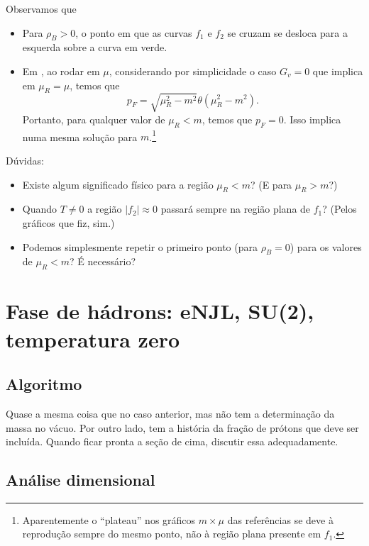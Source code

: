 Observamos que
\begin{itemize}
	\item Para $\rho_B > 0$, o ponto em que as curvas $f_1$ e $f_2$ se cruzam se desloca para a esquerda sobre a curva em verde.
	\item Em \textcite{Buballa1996}, ao rodar em $\mu$, considerando por simplicidade o caso $G_v = 0$ que implica em $\mu_R = \mu$, temos que
		\begin{equation}
			p_F = \sqrt{\mu_R^2 - m^2}\theta(\mu_R^2 - m^2).
		\end{equation}
		Portanto, para qualquer valor de $\mu_R < m$, temos que $p_F = 0$. Isso implica numa mesma solução para $m$.\footnote{Aparentemente o ``plateau'' nos gráficos $m \times \mu$ das referências se deve à reprodução sempre do mesmo ponto, não à região plana presente em $f_1$.}
\end{itemize}

Dúvidas:
\begin{itemize}
	\item Existe algum significado físico para a região $\mu_R < m$? (E para $\mu_R > m$?)
	\item Quando $T \neq 0$ a região $|f_2| \approx 0$ passará sempre na região plana de $f_1$? (Pelos gráficos que fiz, sim.)
	\item Podemos simplesmente repetir o primeiro ponto (para $\rho_B = 0$) para os valores de $\mu_R < m$? É necessário?
\end{itemize}

\section{Fase de hádrons: eNJL, SU(2), temperatura zero}

\subsection{Algoritmo}

Quase a mesma coisa que no caso anterior, mas não tem a determinação da massa no vácuo. Por outro lado, tem a história da fração de prótons que deve ser incluída. Quando ficar pronta a seção de cima, discutir essa adequadamente.

\subsection{Análise dimensional}


